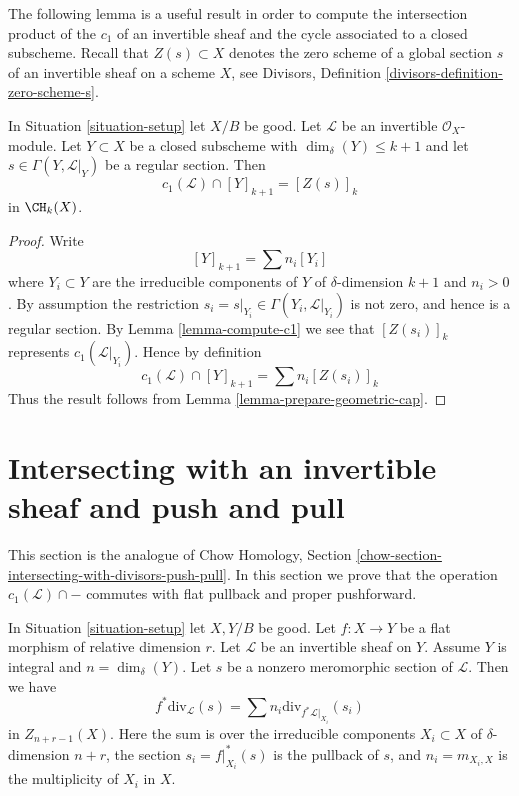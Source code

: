 \noindent
The following lemma is a useful result in order to compute the intersection
product of the $c_1$ of an invertible sheaf and the cycle associated
to a closed subscheme.
Recall that $Z(s) \subset X$ denotes the zero scheme of a global section
$s$ of an invertible sheaf on a scheme $X$, see
Divisors, Definition \ref{divisors-definition-zero-scheme-s}.

\begin{lemma}
\label{lemma-geometric-cap}
In Situation \ref{situation-setup} let $X/B$ be good.
Let $\mathcal{L}$ be an invertible $\mathcal{O}_X$-module.
Let $Y \subset X$ be a closed subscheme with
$\dim_\delta(Y) \leq k + 1$ and let $s \in \Gamma(Y, \mathcal{L}|_Y)$
be a regular section. Then
$$
c_1(\mathcal{L}) \cap [Y]_{k + 1} = [Z(s)]_k
$$
in $\CH_k(X)$.
\end{lemma}

\begin{proof}
Write
$$
[Y]_{k + 1} = \sum n_i[Y_i]
$$
where $Y_i \subset Y$ are the irreducible components of
$Y$ of $\delta$-dimension $k + 1$ and $n_i > 0$.
By assumption the restriction
$s_i = s|_{Y_i} \in \Gamma(Y_i, \mathcal{L}|_{Y_i})$ is not
zero, and hence is a regular section. By Lemma \ref{lemma-compute-c1}
we see that $[Z(s_i)]_k$ represents $c_1(\mathcal{L}|_{Y_i})$.
Hence by definition
$$
c_1(\mathcal{L}) \cap [Y]_{k + 1} = \sum n_i[Z(s_i)]_k
$$
Thus the result follows from Lemma \ref{lemma-prepare-geometric-cap}.
\end{proof}









\section{Intersecting with an invertible sheaf and push and pull}
\label{section-intersecting-with-divisors-push-pull}

\noindent
This section is the analogue of
Chow Homology, Section \ref{chow-section-intersecting-with-divisors-push-pull}.
In this section we prove that the operation $c_1(\mathcal{L}) \cap -$
commutes with flat pullback and proper pushforward.

\begin{lemma}
\label{lemma-prepare-flat-pullback-cap-c1}
In Situation \ref{situation-setup} let $X, Y/B$ be good.
Let $f : X \to Y$ be a flat morphism of relative dimension $r$.
Let $\mathcal{L}$ be an invertible sheaf on $Y$.
Assume $Y$ is integral and $n = \dim_\delta(Y)$.
Let $s$ be a nonzero meromorphic section of $\mathcal{L}$.
Then we have
$$
f^*\text{div}_\mathcal{L}(s) = \sum n_i\text{div}_{f^*\mathcal{L}|_{X_i}}(s_i)
$$
in $Z_{n + r - 1}(X)$. Here the sum is over the irreducible
components $X_i \subset X$ of $\delta$-dimension $n + r$,
the section $s_i = f|_{X_i}^*(s)$ is the pullback of $s$, and
$n_i = m_{X_i, X}$ is the multiplicity of $X_i$ in $X$.
\end{lemma}

